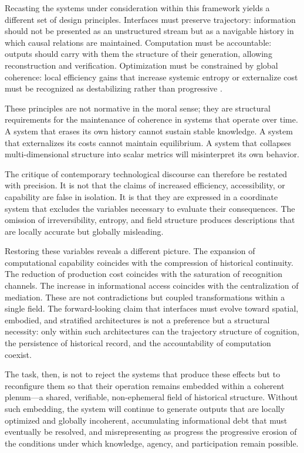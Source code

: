 \documentclass[12pt, a4paper]{article}
\begin{document}
Recasting the systems under consideration within this framework yields a different set of design principles. Interfaces must preserve trajectory: information should not be presented as an unstructured stream but as a navigable history in which causal relations are maintained. Computation must be accountable: outputs should carry with them the structure of their generation, allowing reconstruction and verification. Optimization must be constrained by global coherence: local efficiency gains that increase systemic entropy or externalize cost must be recognized as destabilizing rather than progressive \cite{Prigogine1984}.

These principles are not normative in the moral sense; they are structural requirements for the maintenance of coherence in systems that operate over time. A system that erases its own history cannot sustain stable knowledge. A system that externalizes its costs cannot maintain equilibrium. A system that collapses multi-dimensional structure into scalar metrics will misinterpret its own behavior.

The critique of contemporary technological discourse can therefore be restated with precision. It is not that the claims of increased efficiency, accessibility, or capability are false in isolation. It is that they are expressed in a coordinate system that excludes the variables necessary to evaluate their consequences. The omission of irreversibility, entropy, and field structure produces descriptions that are locally accurate but globally misleading.

Restoring these variables reveals a different picture. The expansion of computational capability coincides with the compression of historical continuity. The reduction of production cost coincides with the saturation of recognition channels. The increase in informational access coincides with the centralization of mediation. These are not contradictions but coupled transformations within a single field. The forward-looking claim that interfaces must evolve toward spatial, embodied, and stratified architectures is not a preference but a structural necessity: only within such architectures can the trajectory structure of cognition, the persistence of historical record, and the accountability of computation coexist.

The task, then, is not to reject the systems that produce these effects but to reconfigure them so that their operation remains embedded within a coherent plenum---a shared, verifiable, non-ephemeral field of historical structure. Without such embedding, the system will continue to generate outputs that are locally optimized and globally incoherent, accumulating informational debt that must eventually be resolved, and misrepresenting as progress the progressive erosion of the conditions under which knowledge, agency, and participation remain possible.
\end{document}
